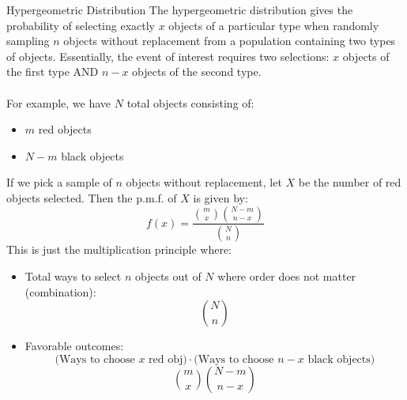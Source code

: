 ﻿\documentclass[12pt]{article}
\begin{document}
\begin{definition}{Hypergeometric Distribution}
The hypergeometric distribution gives the probability of selecting exactly $x$ objects of a particular type when randomly sampling $n$ objects without replacement from a population containing two types of objects. Essentially, the event of interest requires two selections: $x$ objects of the first type AND $n-x$ objects of the second type.\\\\
For example, we have $N$ total objects consisting of:
\begin{itemize}
    \item $m$ red objects
    \item $N-m$ black objects
\end{itemize}
If we pick a sample of $n$ objects without replacement, let $X$ be the number of red objects selected. Then the p.m.f. of $X$ is given by:
\[\boxed{f(x) = \frac{\binom{m}{x}\binom{N-m}{n-x}}{\binom{N}{n}}}\]
This is just the multiplication principle where:
\begin{itemize}
    \item Total ways to select $n$ objects out of $N$ where order does not matter (combination):
    \[\binom{N}{n}\]
    \item Favorable outcomes:
    \[\text{(Ways to choose $x$ red obj)}\cdot\text{(Ways to choose $n-x$ black objects)}\]
    \[\binom{m}{x}\binom{N-m}{n-x}\]
\end{itemize}
\end{definition}
\newpage
\end{document}
